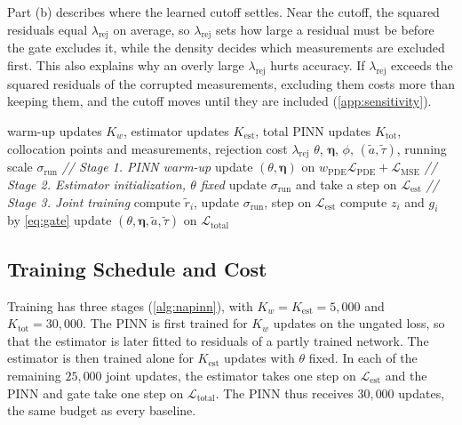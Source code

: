 \documentclass[twoside]{article}
\newcommand{\rej}{\lambda_{\mathrm{rej}}}
\newcommand{\sigrun}{\sigma_{\mathrm{run}}}
\newcommand{\wpde}{w_{\mathrm{PDE}}}
\begin{document}
Part (b) describes where the learned cutoff settles. Near the cutoff, the
squared residuals equal $\rej$ on average, so $\rej$ sets how large a residual
must be before the gate excludes it, while the density decides which
measurements are excluded first. This also explains why an overly large $\rej$
hurts accuracy. If $\rej$ exceeds the squared residuals of the corrupted
measurements, excluding them costs more than keeping them, and the cutoff moves
until they are included (\cref{app:sensitivity}).

\begin{algorithm}[t]
\caption{naPINN}
\label{alg:napinn}
\begin{algorithmic}[1]
 warm-up updates $K_w$, estimator updates
$K_{\mathrm{est}}$, total PINN updates $K_{\mathrm{tot}}$, collocation points and
measurements, rejection cost $\rej$
 $\theta$, $\boldsymbol{\eta}$, $\phi$,
$(\tilde a, \tilde\tau)$, running scale $\sigrun$
\STATE \textit{// Stage 1. PINN warm-up}
  \STATE update $(\theta, \boldsymbol{\eta})$ on
  $\wpde\mathcal{L}_{\mathrm{PDE}} + \mathcal{L}_{\mathrm{MSE}}$
\ENDFOR
\STATE \textit{// Stage 2. Estimator initialization, $\theta$ fixed}
  \STATE update $\sigrun$ and take a step on $\mathcal{L}_{\mathrm{est}}$
\ENDFOR
\STATE \textit{// Stage 3. Joint training}
  \STATE compute $\tilde r_i$, update $\sigrun$, step on $\mathcal{L}_{\mathrm{est}}$
  \STATE compute $z_i$ and $g_i$ by \cref{eq:gate}
  \STATE update $(\theta, \boldsymbol{\eta}, \tilde a, \tilde\tau)$ on
  $\mathcal{L}_{\mathrm{total}}$
\ENDFOR
\end{algorithmic}
\end{algorithm}

\subsection{Training Schedule and Cost}
\label{sec:schedule}
Training has three stages (\cref{alg:napinn}), with
$K_w = K_{\mathrm{est}} = 5{,}000$ and $K_{\mathrm{tot}} = 30{,}000$. The PINN is
first trained for $K_w$ updates on the ungated loss, so that the estimator is
later fitted to residuals of a partly trained network. The estimator is then
trained alone for $K_{\mathrm{est}}$ updates with $\theta$ fixed. In each of the
remaining $25{,}000$ joint updates, the estimator takes one step on
$\mathcal{L}_{\mathrm{est}}$ and the PINN and gate take one step on
$\mathcal{L}_{\mathrm{total}}$. The PINN thus receives $30{,}000$ updates, the
same budget as every baseline.
\end{document}
